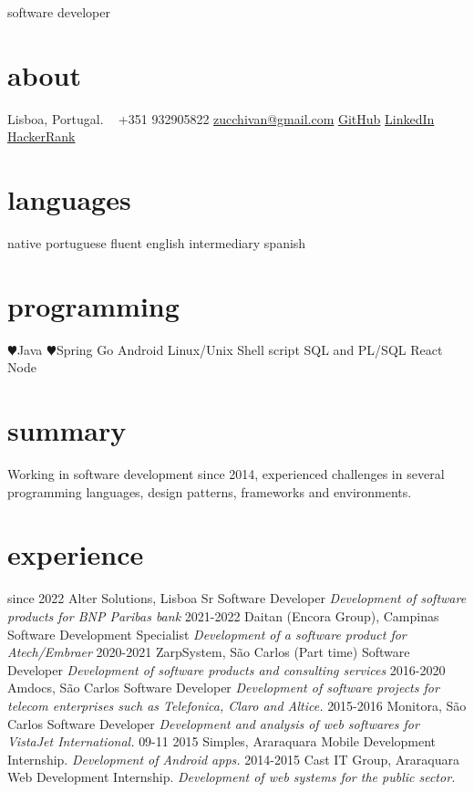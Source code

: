 \documentclass[]{friggeri-cv}
\begin{document}
       {software developer}


\begin{aside}
  \section{about}
    Lisboa,
    Portugal.
    ~
    +351 932905822
    \href{mailto:zucchivan@gmail.com}{zucchivan@gmail.com}
    \faGithub \hspace{0pt} \href{https://github.com/zucchivan/}{GitHub}
    \faLinkedin \hspace{0pt} \href{http://linkedin.com/zucchivan}{LinkedIn}
    \faHackerrank \hspace{0pt} \href{https://www.hackerrank.com/zucchivan}{HackerRank}
  \section{languages}
    native portuguese
    fluent english
    intermediary spanish
  \section{programming}
    {\color{red} $\varheartsuit$}Java
    {\color{red} $\varheartsuit$}Spring
    Go
    Android
    Linux/Unix
    Shell script
    SQL and PL/SQL
    React
    Node
\end{aside}

\section{summary}
    Working in software development since 2014, experienced challenges in several programming languages, design patterns, frameworks and environments. 

\section{experience}
\begin{entrylist}
  \entry
    {since 2022}
    {Alter Solutions, Lisboa}
    {Sr Software Developer}
    {\emph{Development of software products for BNP Paribas bank}}
  \entry
    {2021-2022}
    {Daitan (Encora Group), Campinas}
    {Software Development Specialist}
    {\emph{Development of a software product for Atech/Embraer}}
  \entry
    {2020-2021}
    {ZarpSystem, São Carlos (Part time)}
    {Software Developer}
    {\emph{Development of software products and consulting services}}
  \entry
    {2016-2020}
    {Amdocs, São Carlos}
    {Software Developer}
    {\emph{Development of software projects for telecom enterprises such as Telefonica, Claro and Altice.}}
  \entry
    {2015-2016}
    {Monitora, São Carlos}
    {Software Developer}
    {\emph{Development and analysis of web softwares for VistaJet International.}}
  \entry
    {09-11 2015}
    {Simples, Araraquara}
    {Mobile Development Internship.}
    {\emph{Development of Android apps.}}
  \entry
    {2014-2015}
    {Cast IT Group, Araraquara}
    {Web Development Internship.}
    {\emph{Development of web systems for the public sector.}}


\end{entrylist}
    
\end{document}
